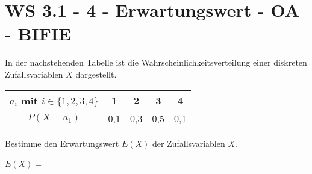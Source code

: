 \section{WS 3.1 - 4 - Erwartungswert - OA - BIFIE}

\begin{beispiel}[WS 3.1]{1} %
In der nachstehenden Tabelle ist die Wahrscheinlichkeitsverteilung einer diskreten Zufallsvariablen
$X$ dargestellt.

\begin{center}
\begin{tabular}{|c|c|c|c|c|} \hline
$a_i$ mit $i \in \{1,2,3,4\}$ & 1&2&3&4 \\ \hline
$P(X=a_1)$ & 0,1&0,3&0,5&0,1 \\ \hline
\end{tabular}
\end{center}

Bestimme den Erwartungswert $E(X)$ der Zufallsvariablen $X$.\leer

$E(X)=$\,
\end{beispiel} 